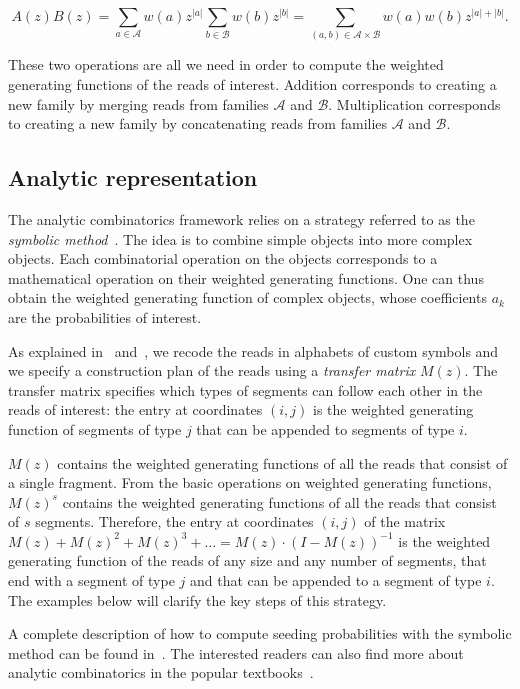 \documentclass{article}
\begin{document}
\begin{equation*}
A(z)B(z) =
\sum_{a\in \mathcal{A}}w(a)z^{|a|} \sum_{b\in \mathcal{B}}w(b)z^{|b|}
= \sum_{(a,b) \in \mathcal{A} \times \mathcal{B}} w(a)w(b)z^{|a|+|b|}.
\end{equation*}

These two operations are all we need in order to compute the weighted
generating functions of the reads of interest. Addition corresponds to
creating a new family by merging reads from families $\mathcal{A}$ and
$\mathcal{B}$. Multiplication corresponds to creating a new family by
concatenating reads from families $\mathcal{A}$ and $\mathcal{B}$.

\subsection{Analytic representation}

The analytic combinatorics framework relies on a strategy referred to as
the \emph{symbolic method}~\cite{sedgewick2013introduction}. The idea is
to combine simple objects into more complex objects. Each combinatorial
operation on the objects corresponds to a mathematical operation on their
weighted generating functions. One can thus obtain the weighted generating
function of complex objects, whose coefficients $a_k$ are the
probabilities of interest.

As explained in~\cite{filion2017analytic} and~\cite{filion2018analytic},
we recode the reads in alphabets of custom symbols and we specify a
construction plan of the reads using a \emph{transfer matrix} $M(z)$. The
transfer matrix specifies which types of segments can follow each other in
the reads of interest: the entry at coordinates $(i,j)$ is the weighted
generating function of segments of type $j$ that can be appended to
segments of type $i$.

$M(z)$ contains the weighted generating functions of all the reads that
consist of a single fragment. From the basic operations on weighted
generating functions, $M(z)^s$ contains the weighted generating functions
of all the reads that consist of $s$ segments. Therefore, the entry at
coordinates $(i,j)$ of the matrix $M(z) + M(z)^2 + M(z)^3 + \ldots = M(z)
\cdot (I-M(z))^{-1}$ is the weighted generating function of the reads of
any size and any number of segments, that end with a segment of type $j$
and that can be appended to a segment of type $i$. The examples below will
clarify the key steps of this strategy.

A complete description of how to compute seeding probabilities with the
symbolic method can be found in~\cite{filion2017analytic,
filion2018analytic}. The interested readers can also find more about
analytic combinatorics in the popular
textbooks~\cite{flajolet2009analytic, sedgewick2013introduction}.
\end{document}
